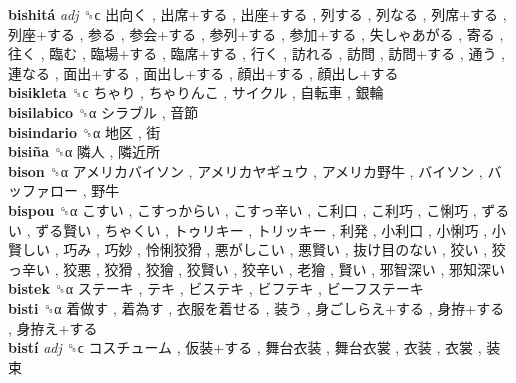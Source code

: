 \textbf{bishitá} \emph{adj}  ␝ϲ   出向く ,  出席+する ,  出座+する ,  列する ,  列なる ,  列席+する ,  列座+する ,  参る ,  参会+する ,  参列+する ,  参加+する ,  失しゃあがる ,  寄る ,  往く ,  臨む ,  臨場+する ,  臨席+する ,  行く ,  訪れる ,  訪問 ,  訪問+する ,  通う ,  連なる ,  面出+する ,  面出し+する ,  顔出+する ,  顔出し+する   \\
\textbf{bisikleta} ␝ϲ   ちゃり ,  ちゃりんこ ,  サイクル ,  自転車 ,  銀輪   \\
\textbf{bisilabico} ␝α   シラブル ,  音節   \\
\textbf{bisindario} ␝α   地区 ,  街   \\
\textbf{bisiña} ␝α   隣人 ,  隣近所   \\
\textbf{bison} ␝α   アメリカバイソン ,  アメリカヤギュウ ,  アメリカ野牛 ,  バイソン ,  バッファロー ,  野牛   \\
\textbf{bispou} ␝α   こすい ,  こすっからい ,  こすっ辛い ,  こ利口 ,  こ利巧 ,  こ悧巧 ,  ずるい ,  ずる賢い ,  ちゃくい ,  トゥリキー ,  トリッキー ,  利発 ,  小利口 ,  小悧巧 ,  小賢しい ,  巧み ,  巧妙 ,  怜悧狡猾 ,  悪がしこい ,  悪賢い ,  抜け目のない ,  狡い ,  狡っ辛い ,  狡悪 ,  狡猾 ,  狡獪 ,  狡賢い ,  狡辛い ,  老獪 ,  賢い ,  邪智深い ,  邪知深い   \\
\textbf{bistek} ␝α   ステーキ ,  テキ ,  ビステキ ,  ビフテキ ,  ビーフステーキ   \\
\textbf{bisti} ␝α   着做す ,  着為す ,  衣服を着せる ,  装う ,  身ごしらえ+する ,  身拵+する ,  身拵え+する   \\
\textbf{bistí} \emph{adj}  ␝ϲ   コスチューム ,  仮装+する ,  舞台衣装 ,  舞台衣裳 ,  衣装 ,  衣裳 ,  装束   \\
